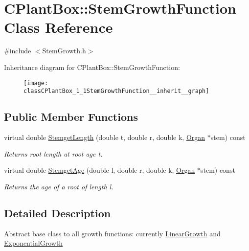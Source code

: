 \hypertarget{classCPlantBox_1_1StemGrowthFunction}{}\section{C\+Plant\+Box\+:\+:Stem\+Growth\+Function Class Reference}
\label{classCPlantBox_1_1StemGrowthFunction}


{\ttfamily \#include $<$Stem\+Growth.\+h$>$}



Inheritance diagram for C\+Plant\+Box\+:\+:Stem\+Growth\+Function\+:\nopagebreak
\begin{figure}[H]
\begin{center}
\leavevmode
\texttt{[image: classCPlantBox\_1\_1StemGrowthFunction\_\_inherit\_\_graph]}
\end{center}
\end{figure}
\subsection*{Public Member Functions}
\begin{DoxyCompactItemize}
\item 
virtual double \hyperlink{classCPlantBox_1_1StemGrowthFunction_a108fded2964de8ab07f97b43c65cf78a}{Stemget\+Length} (double t, double r, double k, \hyperlink{classCPlantBox_1_1Organ}{Organ} $\ast$stem) const
\begin{DoxyCompactList}\small\item\em Returns root length at root age t. \end{DoxyCompactList}\item 
virtual double \hyperlink{classCPlantBox_1_1StemGrowthFunction_a94c113c8b153e2cd7f3827f718024992}{Stemget\+Age} (double l, double r, double k, \hyperlink{classCPlantBox_1_1Organ}{Organ} $\ast$stem) const
\begin{DoxyCompactList}\small\item\em Returns the age of a root of length l. \end{DoxyCompactList}\end{DoxyCompactItemize}


\subsection{Detailed Description}
Abstract base class to all growth functions\+: currently \hyperlink{classCPlantBox_1_1LinearGrowth}{Linear\+Growth} and \hyperlink{classCPlantBox_1_1ExponentialGrowth}{Exponential\+Growth}

